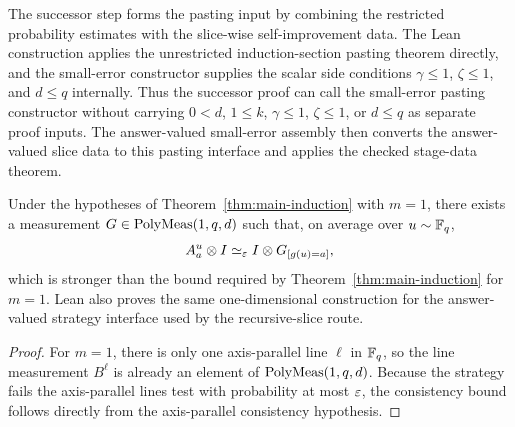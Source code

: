\begin{definition}\label{def:successor-pasting-data}
	\leanok
	The successor step forms the pasting input by combining the restricted
	probability estimates with the slice-wise self-improvement data.  The Lean
	construction applies the unrestricted induction-section pasting theorem directly,
	and the small-error constructor supplies the scalar side conditions
	\(\gamma\le 1\), \(\zeta\le 1\), and \(d\le q\) internally.  Thus the
	successor proof can call the small-error pasting constructor without carrying
	\(0<d\), \(1\le k\), \(\gamma\le 1\), \(\zeta\le 1\), or \(d\le q\) as
	separate proof inputs.  The answer-valued small-error assembly then converts
	the answer-valued slice data to this pasting interface and applies the
	checked stage-data theorem.
\end{definition}

\begin{lemma}\label{lem:main-induction-base}
	\leanok
	Under the hypotheses of Theorem~\ref{thm:main-induction} with $m=1$, there exists a measurement $G \in \mathrm{PolyMeas}(1,q,d)$ such that, on average over $u \sim \mathbb{F}_q$,
	\[
		A_a^u \otimes I \simeq_\varepsilon I \otimes G_{[g(u)=a]},
	\]
	which is stronger than the bound required by Theorem~\ref{thm:main-induction} for $m=1$.
	Lean also proves the same one-dimensional construction for the
	answer-valued strategy interface used by the recursive-slice route.
\end{lemma}
\begin{proof}
	\leanok
	For $m=1$, there is only one axis-parallel line $\ell$ in $\mathbb{F}_q$, so the line measurement $B^\ell$ is already an element of $\mathrm{PolyMeas}(1,q,d)$. Because the strategy fails the axis-parallel lines test with probability at most $\varepsilon$, the consistency bound follows directly from the axis-parallel consistency hypothesis.
\end{proof}

